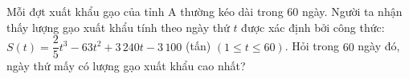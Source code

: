 \begin{ex}%
	Mỗi đợt xuất khẩu gạo của tỉnh A thường kéo dài trong $60$ ngày. Người ta nhận thấy lượng gạo xuất khẩu tính theo ngày thứ $t$ được xác định bởi công thức: $S(t)=\dfrac{2}{5}t^3-63t^2+3\,240t-3\,100$ (tấn) $(1 \le t \le 60)$. Hỏi trong $60$ ngày đó, ngày thứ mấy có lượng gạo xuất khẩu cao nhất?
\end{ex}


